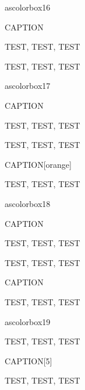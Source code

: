ascolorbox16

\begin{ascolorbox16}{CAPTION}

TEST, TEST, TEST

\end{ascolorbox16}

\begin{ascolorbox16}{}

TEST, TEST, TEST

\end{ascolorbox16}

ascolorbox17

\begin{ascolorbox17}{CAPTION}

TEST, TEST, TEST

\end{ascolorbox17}

\begin{ascolorbox17}{}

TEST, TEST, TEST

\end{ascolorbox17}

\begin{ascolorbox17}{CAPTION}[orange]

TEST, TEST, TEST

\end{ascolorbox17}

ascolorbox18

\begin{ascolorbox18}{CAPTION}

TEST, TEST, TEST

\end{ascolorbox18}

\begin{ascolorbox18}{}

TEST, TEST, TEST

\end{ascolorbox18}

\begin{ascolorbox19}{CAPTION}

TEST, TEST, TEST

ascolorbox19

\end{ascolorbox19}

\begin{ascolorbox19}{}

TEST, TEST, TEST

\end{ascolorbox19}

\begin{ascolorbox19}{CAPTION}[5]

TEST, TEST, TEST

\end{ascolorbox19}

